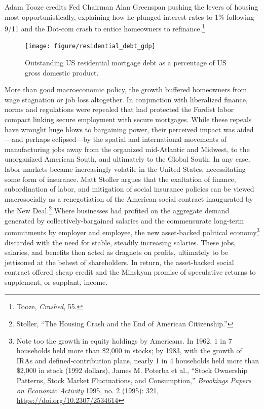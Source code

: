 \documentclass[12pt,oneside]{psthesis}
\begin{document}
Adam Tooze credits Fed Chairman Alan Greenspan pushing the levers of housing most opportunistically, explaining how he plunged interest rates to 1\% following 9/11 and the Dot-com crash to entice homeowners to refinance.\footnote{Tooze, \emph{Crashed}, 55.}
\begin{figure}

{\centering \texttt{[image: figure/residential\_debt\_gdp]} 

}

\caption{Outstanding US residential mortgage debt as a percentage of US gross domestic product.}\label{fig:hhdebt}
\end{figure}
More than good macroeconomic policy, the growth buffered homeowners from wage stagnation or job loss altogether.
In conjunction with liberalized finance, norms and regulations were repealed that had protected the Fordist labor compact linking secure employment with secure mortgages.
While these repeals have wrought huge blows to bargaining power, their perceived impact was aided---and perhaps eclipsed---by the spatial and international movements of manufacturing jobs away from the organized mid-Atlantic and Midwest, to the unorganized American South, and ultimately to the Global South.
In any case, labor markets became increasingly volatile in the United States, necessitating some form of insurance.
Matt Stoller argues that the exaltation of finance, subordination of labor, and mitigation of social insurance policies can be viewed macrosocially as a renegotiation of the American social contract inaugurated by the New Deal.\footnote{Stoller, ``The Housing Crash and the End of American Citizenship.''}
Where businesses had profited on the aggregate demand generated by collectively-bargained salaries and the commensurate long-term commitments by employer and employee, the new asset-backed political economy\footnote{Note too the growth in equity holdings by Americans. In 1962, 1 in 7 households held more than \$2,000 in stocks; by 1983, with the growth of IRAs and defined-contribution plans, nearly 1 in 4 households held more than \$2,000 in stock (1992 dollars), James M. Poterba et al., ``Stock Ownership Patterns, Stock Market Fluctuations, and Consumption,'' \emph{Brookings Papers on Economic Activity} 1995, no. 2 (1995): 321, \url{https://doi.org/10.2307/2534614}} discarded with the need for stable, steadily increasing salaries.
These jobs, salaries, and benefits then acted as dragnets on profits, ultimately to be jettisoned at the behest of shareholders.
In return, the asset-backed social contract offered cheap credit and the Minskyan promise of speculative returns to supplement, or supplant, income.
\end{document}
